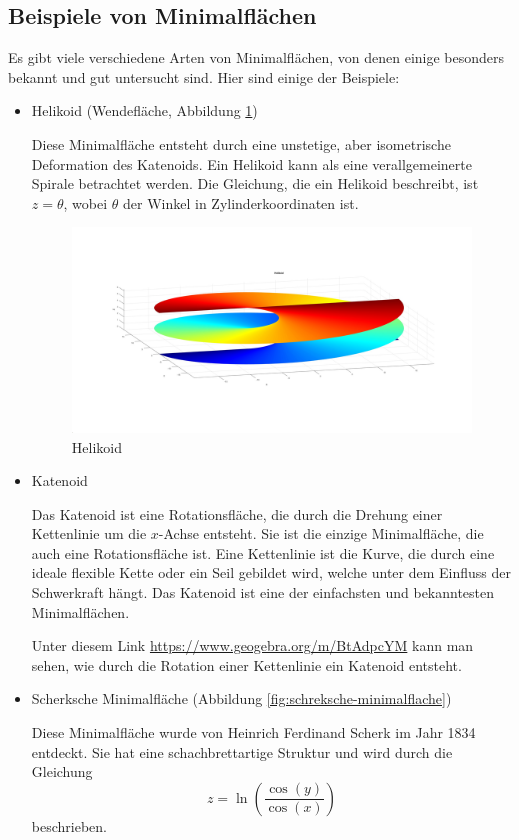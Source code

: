 \subsection{Beispiele von Minimalflächen
	\label{minimalflaechen:subsection:Beispiele von Minimalflächen}}
Es gibt viele verschiedene Arten von Minimalflächen, von denen einige besonders bekannt und gut untersucht sind.
Hier sind einige der Beispiele:
\begin{itemize}
	\item
	Helikoid (Wendefläche, Abbildung \ref{fig:helikoid})
	
	Diese Minimalfläche entsteht durch eine unstetige, aber isometrische Deformation des Katenoids.
	Ein Helikoid kann als eine verallgemeinerte Spirale betrachtet werden.
	Die Gleichung, die ein Helikoid beschreibt, ist $z=\theta$, wobei $\theta$ der Winkel in Zylinderkoordinaten ist.
	
\begin{figure}
	\centering
	\includegraphics[width=0.7\linewidth]{papers/minimalflaechen/Helikoid}
	\caption{Helikoid}
	\label{fig:helikoid}
\end{figure}

	\item
	Katenoid
	
	Das Katenoid ist eine Rotationsfläche, die durch die Drehung einer Kettenlinie um die $x$-Achse entsteht.
	Sie ist die einzige Minimalfläche, die auch eine Rotationsfläche ist.
	Eine Kettenlinie ist die Kurve, die durch eine ideale flexible Kette oder ein Seil gebildet wird, welche unter dem Einfluss der Schwerkraft hängt.
	Das Katenoid ist eine der einfachsten und bekanntesten Minimalflächen.
	
	Unter diesem Link \url{https://www.geogebra.org/m/BtAdpcYM} kann man sehen, wie durch die Rotation einer Kettenlinie ein Katenoid entsteht.
	\item
	Scherksche Minimalfläche (Abbildung \ref{fig:schreksche-minimalflache})
	
	Diese Minimalfläche wurde von Heinrich Ferdinand Scherk im Jahr 1834 entdeckt.
	Sie hat eine schachbrettartige Struktur und wird durch die Gleichung 
	\begin{equation}
		z=\ln(\frac{\cos(y)}{\cos(x)}) 
	\end{equation}
	beschrieben.


\end{itemize}
